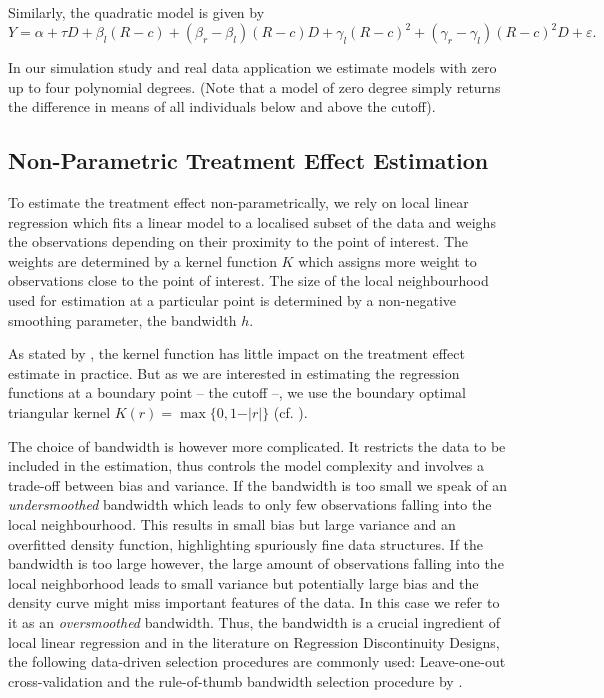 Similarly, the quadratic model is given by
\begin{equation}
Y = \alpha + \tau D + \beta_{l} (R-c) + (\beta_{r} - \beta_{l}) (R-c) D + \gamma_{l} (R-c)^2 + (\gamma_{r} - \gamma_{l}) (R-c)^2 D + \varepsilon .
\end{equation}

In our simulation study and real data application we estimate models with zero up to four polynomial degrees. (Note that a model of zero degree simply returns the difference in means of all individuals below and above the cutoff).



\subsection{Non-Parametric Treatment Effect Estimation} %
\label{sec: non-param}
To estimate the treatment effect non-parametrically, we rely on local linear regression which fits a linear model to a localised subset of the data and weighs the observations depending on their proximity to the point of interest. The weights are determined by a kernel function $K$ which assigns more weight to observations close to the point of interest. The size of the local neighbourhood used for estimation at a particular point is determined by a non-negative smoothing parameter, the bandwidth $h$.

As stated by \cite{lee_lemieux}, the kernel function has little impact on the treatment effect estimate in practice. But as we are interested in estimating the regression functions at a boundary point -- the cutoff --, we use the boundary optimal triangular kernel $K(r) = \max \lbrace 0, 1 - \vert r \vert \rbrace$ (cf. \cite{cheng_et_al}).

The choice of bandwidth is however more complicated. It restricts the data to be included in the estimation, thus controls the model complexity and involves a trade-off between bias and variance. If the bandwidth is too small we speak of an \textit{undersmoothed} bandwidth which leads to only few observations falling into the local neighbourhood. This results in small bias but large variance and an overfitted density function, highlighting spuriously fine data structures. If the bandwidth is too large however, the large amount of observations falling into the local neighborhood leads to small variance but potentially large bias and the density curve might miss important features of the data. In this case we refer to it as an \textit{oversmoothed} bandwidth. Thus, the bandwidth is a crucial ingredient of local linear regression and in the literature on Regression Discontinuity Designs, the following data-driven selection procedures are commonly used: Leave-one-out cross-validation and the rule-of-thumb bandwidth selection procedure by \cite{fan_gij}.

